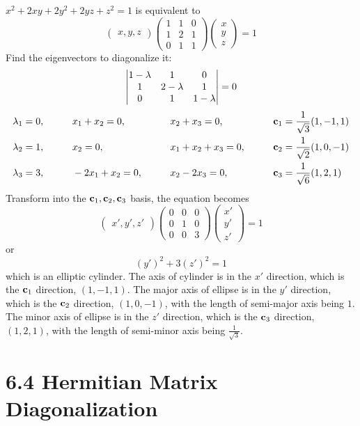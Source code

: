 \documentclass[a4paper]{article}
\begin{document}
\renewcommand{\arraystretch}{1}
$x^2+2xy+2y^2+2yz+z^2=1$ is equivalent to 
\[
\begin{pmatrix}
x,y,z
\end{pmatrix}
\begin{pmatrix}
1&1&0\\
1&2&1\\
0&1&1
\end{pmatrix}
\begin{pmatrix}
x\\y\\z
\end{pmatrix}=1
\]
Find the eigenvectors to diagonalize it:
\[
\begin{vmatrix}
1-\lambda&1&0\\
1&2-\lambda&1\\
0&1&1-\lambda
\end{vmatrix}=0
\]
\begin{alignat*}{4}
    & \lambda_1=0 ,\qquad && x_1+x_2=0,\qquad && x_2+x_3=0,\qquad && \mathbf{c}_1=\frac{1}{\sqrt{3}}(1,-1,1)\\
    & \lambda_2=1 ,\qquad && x_2=0,\qquad && x_1+x_2+x_3=0,\qquad && \mathbf{c}_2=\frac{1}{\sqrt{2}}(1,0,-1)\\
    & \lambda_3=3 ,\qquad && -2x_1+x_2=0,\qquad && x_2-2x_3=0,\qquad && \mathbf{c}_3=\frac{1}{\sqrt{6}}(1,2,1)\\
\end{alignat*}
Transform into the $\mathbf{c}_1,\mathbf{c}_2,\mathbf{c}_3$ basis, the equation becomes
\[
\begin{pmatrix}
x',y',z'
\end{pmatrix}
\begin{pmatrix}
0&0&0\\
0&1&0\\
0&0&3
\end{pmatrix}
\begin{pmatrix}
x'\\y'\\z'
\end{pmatrix}=1
\]
or
\[
(y')^2+3(z')^2=1
\]
which is an elliptic cylinder.
The axis of cylinder is in the $x'$ direction, which is the $\mathbf{c}_1$ direction, $(1,-1,1)$.
The major axis of ellipse is in the $y'$ direction,  which is the $\mathbf{c}_2$ direction, $(1,0,-1)$, with the length of semi-major axis being $1$.
The minor axis of ellipse is in the $z'$ direction,  which is the $\mathbf{c}_3$ direction, $(1,2,1)$, with the length of semi-minor axis being $\frac{1}{\sqrt{3}}$.

\section*{6.4 Hermitian Matrix Diagonalization}
\end{document}
